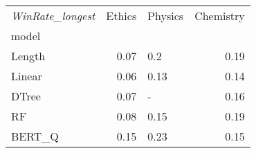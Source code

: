 \begin{tabular}{lrlr}
\toprule
\textit{WinRate\_longest} &  Ethics & Physics &  
Chemistry \\
model  &         &         &            \\
\midrule
Length &    0.07 &     0.2 &       0.19 \\
Linear &    0.06 &    0.13 &       0.14 \\
DTree  &    0.07 &       - &       0.16 \\
RF     &    0.08 &    0.15 &       0.19 \\
BERT\_Q &    0.15 &    0.23 &       0.15 \\
\bottomrule
\end{tabular}
